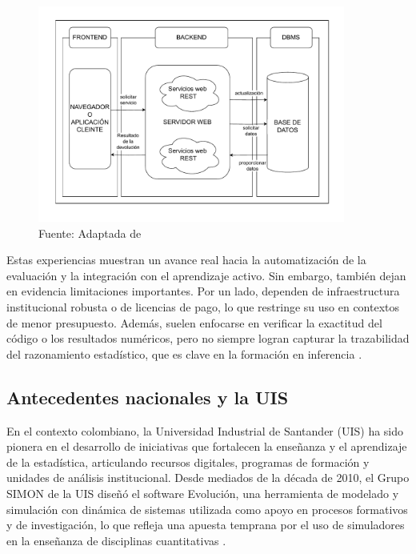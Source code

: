\documentclass[letter,oneside,12pt,spanish]{report}
\begin{document}
\begin{figure}[ht]
    \centering
    \includegraphics[width=0.9\textwidth]{Figs/Microservicios.pdf}
    \label{fig:Microservicios}
    \\Fuente: Adaptada de \textcite{Mostefai2025}
\end{figure}



Estas experiencias muestran un avance real hacia la automatización de la evaluación y la integración con el aprendizaje activo. Sin embargo, también dejan en evidencia limitaciones importantes. Por un lado, dependen de infraestructura institucional robusta o de licencias de pago, lo que restringe su uso en contextos de menor presupuesto. Además, suelen enfocarse en verificar la exactitud del código o los resultados numéricos, pero no siempre logran capturar la trazabilidad del razonamiento estadístico, que es clave en la formación en inferencia \parencite{alhaddad2024}.



\subsection{Antecedentes nacionales y la UIS}

En el contexto colombiano, la Universidad Industrial de Santander (UIS) ha sido pionera en el 
desarrollo de iniciativas que fortalecen la enseñanza y el aprendizaje de la estadística, 
articulando recursos digitales, programas de formación y unidades de análisis institucional. 
Desde mediados de la década de 2010, el Grupo SIMON de la UIS diseñó el software Evolución, una 
herramienta de modelado y simulación con dinámica de sistemas utilizada como apoyo en procesos 
formativos y de investigación, lo que refleja una apuesta temprana por el uso de simuladores en 
la enseñanza de disciplinas cuantitativas \parencite{simon2016}.
\end{document}
